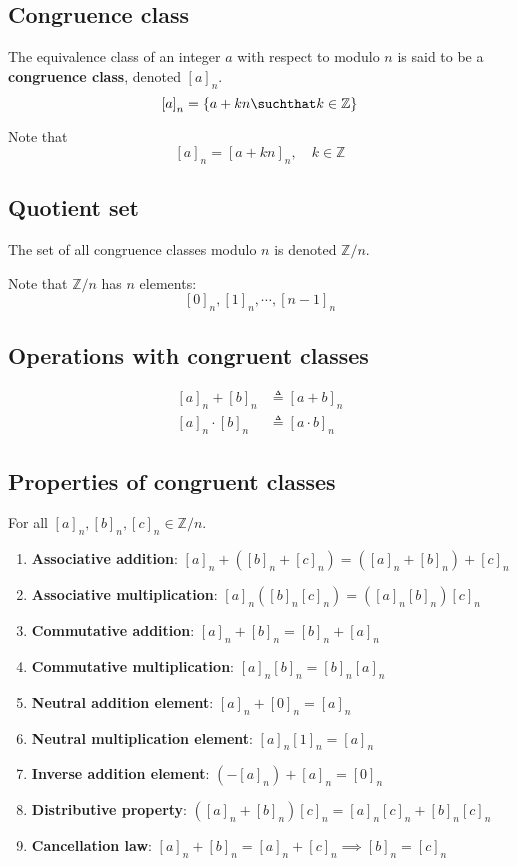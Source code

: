 \documentclass[a4paper]{article}
\begin{document}
\subsection{Congruence class}

The equivalence class of an integer \(a\) with respect to modulo \(n\)
is said to be a \textbf{congruence class}, denoted \({[a]}_n\).
\[
    {[a]}_n = \{a+kn \suchthat k \in \mathbb{Z}\}
\]

Note that
\[
    {[a]}_n = {[a + kn]}_n,\quad k \in \mathbb{Z}
\]

\subsection{Quotient set}

The set of all congruence classes modulo \(n\) is denoted \(\mathbb{Z} / n\).

Note that \(\mathbb{Z} / n\) has \(n\) elements:
\[
    {[0]}_n,{[1]}_n,\cdots,{[n-1]}_n
\]

\subsection{Operations with congruent classes}

\begin{align*}
    {[a]}_n + {[b]}_n &\triangleq {[a+b]}_n \\
    {[a]}_n \cdot {[b]}_n &\triangleq {[a \cdot b]}_n
\end{align*}

\subsection{Properties of congruent classes}

For all \({[a]}_n, {[b]}_n, {[c]}_n \in \mathbb{Z}/n\).

\begin{enumerate}
    \item \textbf{Associative addition}: \({[a]}_n + ({[b]}_n + {[c]}_n) = ({[a]}_n + {[b]}_n) + {[c]}_n\)
    \item \textbf{Associative multiplication}: \({[a]}_n ({[b]}_n {[c]}_n) = ({[a]}_n {[b]}_n) {[c]}_n\)
    \item \textbf{Commutative addition}: \({[a]}_n + {[b]}_n = {[b]}_n + {[a]}_n\)
    \item \textbf{Commutative multiplication}: \({[a]}_n {[b]}_n = {[b]}_n {[a]}_n\)
    \item \textbf{Neutral addition element}: \({[a]}_n + {[0]}_n = {[a]}_n\)
    \item \textbf{Neutral multiplication element}: \({[a]}_n {[1]}_n = {[a]}_n\)
    \item \textbf{Inverse addition element}: \((-{[a]}_n) + {[a]}_n = {[0]}_n\)
    \item \textbf{Distributive property}: \(({[a]}_n + {[b]}_n) {[c]}_n = {[a]}_n{[c]}_n + {[b]}_n{[c]}_n\)
    \item \textbf{Cancellation law}: \({[a]}_n + {[b]}_n = {[a]}_n + {[c]}_n \implies {[b]}_n = {[c]}_n\)
\end{enumerate}
\end{document}
